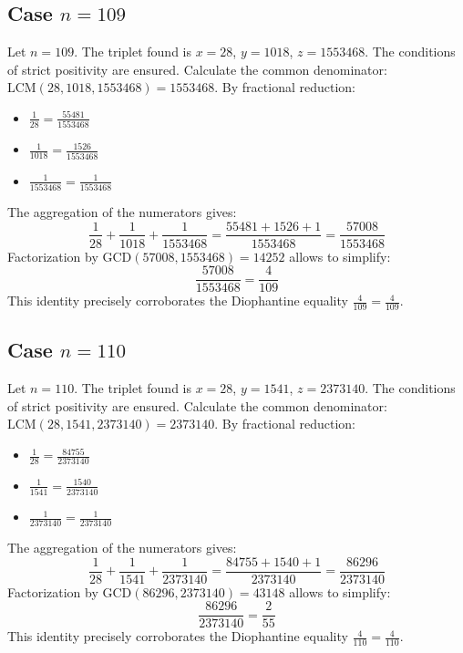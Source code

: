 \documentclass[11pt,a4paper]{article}
\begin{document}
\subsection{Case $n = 109$}
Let $n = 109$. The triplet found is $x = 28$, $y = 1018$, $z = 1553468$.
The conditions of strict positivity are ensured.
Calculate the common denominator: $\text{LCM}(28, 1018, 1553468) = 1553468$.
By fractional reduction:
\begin{itemize}
    \item $\frac{1}{28} = \frac{55481}{1553468}$
    \item $\frac{1}{1018} = \frac{1526}{1553468}$
    \item $\frac{1}{1553468} = \frac{1}{1553468}$
\end{itemize}
The aggregation of the numerators gives:
$$ \frac{1}{28} + \frac{1}{1018} + \frac{1}{1553468} = \frac{55481 + 1526 + 1}{1553468} = \frac{57008}{1553468} $$
Factorization by $\text{GCD}(57008, 1553468) = 14252$ allows to simplify:
$$ \frac{57008}{1553468} = \frac{4}{109} $$
This identity precisely corroborates the Diophantine equality $\frac{4}{109} = \frac{4}{109}$.

\subsection{Case $n = 110$}
Let $n = 110$. The triplet found is $x = 28$, $y = 1541$, $z = 2373140$.
The conditions of strict positivity are ensured.
Calculate the common denominator: $\text{LCM}(28, 1541, 2373140) = 2373140$.
By fractional reduction:
\begin{itemize}
    \item $\frac{1}{28} = \frac{84755}{2373140}$
    \item $\frac{1}{1541} = \frac{1540}{2373140}$
    \item $\frac{1}{2373140} = \frac{1}{2373140}$
\end{itemize}
The aggregation of the numerators gives:
$$ \frac{1}{28} + \frac{1}{1541} + \frac{1}{2373140} = \frac{84755 + 1540 + 1}{2373140} = \frac{86296}{2373140} $$
Factorization by $\text{GCD}(86296, 2373140) = 43148$ allows to simplify:
$$ \frac{86296}{2373140} = \frac{2}{55} $$
This identity precisely corroborates the Diophantine equality $\frac{4}{110} = \frac{4}{110}$.
\end{document}
